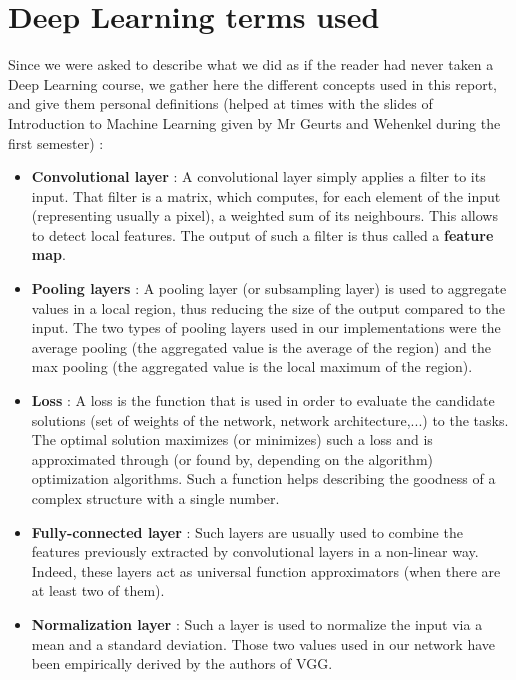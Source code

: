 \documentclass[twocolumn,superscriptaddress,aps,floatfix,nofootinbib]{revtex4-1}
\begin{document}
    \section{Deep Learning terms used}
    
    Since we were asked to describe what we did as if the reader had never taken a Deep Learning course, we gather here the different concepts used in this report, and give them personal definitions (helped at times with the slides of Introduction to Machine Learning given by Mr Geurts and Wehenkel during the first semester) :
    
    \begin{itemize}
        \item \textbf{Convolutional layer} : A convolutional layer simply applies a filter to its input. That filter is a matrix, which computes, for each element of the input (representing usually a pixel), a weighted sum of its neighbours. This allows to detect local features. The output of such a filter is thus called a \textbf{feature map}.
        
        \item \textbf{Pooling layers} : A pooling layer (or subsampling layer) is used to aggregate values in a local region, thus reducing the size of the output compared to the input. The two types of pooling layers used in our implementations were the average pooling (the aggregated value is the average of the region) and the max pooling (the aggregated value is the local maximum of the region).
        
        \item \textbf{Loss} : A loss is the function that is used in order to evaluate the candidate solutions (set of weights of the network, network architecture,...) to the tasks. The optimal solution maximizes (or minimizes) such a loss and is approximated through (or found by, depending on the algorithm) optimization algorithms. Such a function helps describing the goodness of a complex structure with a single number\cite{loss}.
        
        \item \textbf{Fully-connected layer} : Such layers are usually used to combine the features previously extracted by convolutional layers in a non-linear way. Indeed, these layers act as universal function approximators (when there are at least two of them).
        
        \item \textbf{Normalization layer} : Such a layer is used to normalize the input via a mean and a standard deviation. Those two values used in our network have been empirically derived by the authors of VGG.
        

\end{itemize}
\end{document}
